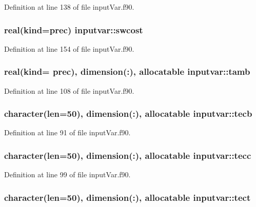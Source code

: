 Definition at line 138 of file input\-Var.\-f90.

\hypertarget{classinputvar_aa9cd3592e06c1cfdc7fee2caf5b13d1f}{
\subsubsection[{swcost}]{\setlength{\rightskip}{0pt plus 5cm}real(kind=prec) inputvar\-::swcost}}\label{classinputvar_aa9cd3592e06c1cfdc7fee2caf5b13d1f}


Definition at line 154 of file input\-Var.\-f90.

\hypertarget{classinputvar_a1cdc501a6b8cb511ab141219362b9aaa}{
\subsubsection[{tamb}]{\setlength{\rightskip}{0pt plus 5cm}real(kind= prec), dimension(\-:), allocatable inputvar\-::tamb}}\label{classinputvar_a1cdc501a6b8cb511ab141219362b9aaa}


Definition at line 108 of file input\-Var.\-f90.

\hypertarget{classinputvar_ab2486a625a1ff1aaf70cb9e38d8c07db}{
\subsubsection[{tecb}]{\setlength{\rightskip}{0pt plus 5cm}character(len=50), dimension(\-:), allocatable inputvar\-::tecb}}\label{classinputvar_ab2486a625a1ff1aaf70cb9e38d8c07db}


Definition at line 91 of file input\-Var.\-f90.

\hypertarget{classinputvar_a2eb1c20cfae159c006e0fdc4b9ef0ef0}{
\subsubsection[{tecc}]{\setlength{\rightskip}{0pt plus 5cm}character(len=50), dimension(\-:), allocatable inputvar\-::tecc}}\label{classinputvar_a2eb1c20cfae159c006e0fdc4b9ef0ef0}


Definition at line 99 of file input\-Var.\-f90.

\hypertarget{classinputvar_afb7d5163d753c7bbd2c1505e8ee68197}{
\subsubsection[{tect}]{\setlength{\rightskip}{0pt plus 5cm}character(len=50), dimension(\-:), allocatable inputvar\-::tect}}\label{classinputvar_afb7d5163d753c7bbd2c1505e8ee68197}



